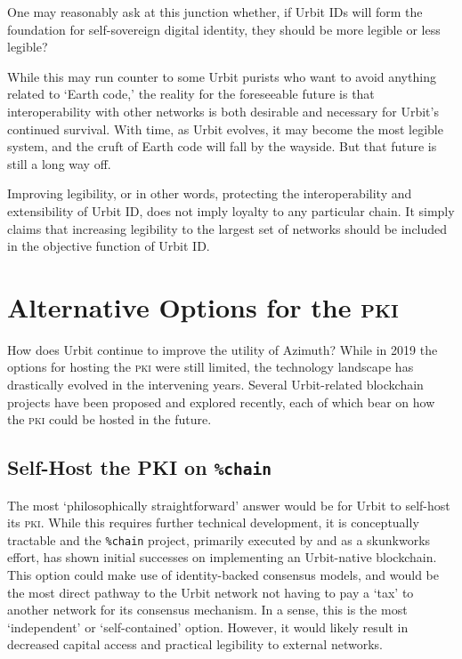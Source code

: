 \documentclass[twoside]{article}
\begin{document}
One may reasonably ask at this junction whether, if Urbit IDs will form the foundation for self-sovereign digital identity, they should be more legible or less legible?

While this may run counter to some Urbit purists who want to avoid anything related to `Earth code,' the reality for the foreseeable future is that interoperability with other networks is both desirable and necessary for Urbit's continued survival. With time, as Urbit evolves, it may become the most legible system, and the cruft of Earth code will fall by the wayside. But that future is still a long way off.

Improving legibility, or in other words, protecting the interoperability and extensibility of Urbit ID, does not imply loyalty to any particular chain. It simply claims that increasing legibility to the largest set of networks should be included in the objective function of Urbit ID.

\section{Alternative Options for the \textsc{pki}}

How does Urbit continue to improve the utility of Azimuth? While in 2019 the options for hosting the \textsc{pki} were still limited, the technology landscape has drastically evolved in the intervening years.  Several Urbit-related blockchain projects have been proposed and explored recently, each of which bear on how the \textsc{pki} could be hosted in the future.

\subsection[Self-Host the \textsc{pki} on \texttt{\%chain}]{Self-Host the PKI on \texttt{\%chain}}

The most `philosophically straightforward' answer would be for Urbit to self-host its \textsc{pki}. While this requires further technical development, it is conceptually tractable and the \lstinline[style=inlinecode]{%chain} project, primarily executed by  and  as a skunkworks effort, has shown initial successes on implementing an Urbit-native blockchain. This option could make use of identity-backed consensus models, and would be the most direct pathway to the Urbit network not having to pay a `tax' to another network for its consensus mechanism. In a sense, this is the most `independent' or `self-contained' option. However, it would likely result in decreased capital access and practical legibility to external networks.
\end{document}
